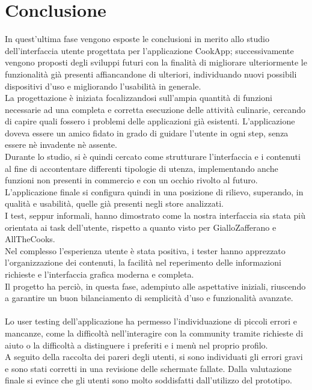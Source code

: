 \section{Conclusione}
In quest'ultima fase vengono esposte le conclusioni in merito allo studio dell'interfaccia utente progettata per l'applicazione CookApp; successivamente vengono proposti degli sviluppi futuri con la finalità di migliorare ulteriormente le funzionalità già presenti affiancandone di ulteriori, individuando nuovi possibili dispositivi d'uso e migliorando l'usabilità in generale.\\
La progettazione è iniziata focalizzandosi sull'ampia quantità di funzioni necessarie ad una completa e corretta esecuzione delle attività culinarie, cercando di capire quali fossero i problemi delle applicazioni già esistenti. L’applicazione doveva essere un amico fidato in grado di guidare l’utente in ogni step, senza essere nè invadente nè assente.\\
Durante lo studio, si è quindi cercato come strutturare l'interfaccia e i contenuti al fine di accontentare differenti tipologie di utenza, implementando anche funzioni non presenti in commercio e con un occhio rivolto al futuro.\\
L'applicazione finale si configura quindi in una posizione di rilievo, superando, in qualità e usabilità, quelle già presenti negli store analizzati.\\
I test, seppur informali, hanno dimostrato come la nostra interfaccia sia stata più orientata ai task dell'utente, rispetto a quanto visto per GialloZafferano e AllTheCooks.\\
Nel complesso l'esperienza utente è stata positiva, i tester hanno apprezzato l'organizzazione dei contenuti, la facilità nel reperimento delle informazioni richieste e l'interfaccia grafica moderna e completa.\\
Il progetto ha perciò, in questa fase, adempiuto alle aspettative iniziali, riuscendo a garantire un buon bilanciamento di semplicità d’uso e funzionalità avanzate.\\\\

Lo user testing dell'applicazione ha permesso l'individuazione di piccoli errori e mancanze, come la difficoltà nell'interagire con la community tramite richieste di aiuto o la difficoltà a distinguere i preferiti e i menù nel proprio profilo.\\
A seguito della raccolta dei pareri degli utenti, si sono individuati gli errori gravi e sono stati corretti in una revisione delle schermate fallate. 
Dalla valutazione finale si evince che gli utenti sono molto soddisfatti dall’utilizzo del prototipo.\\\\

